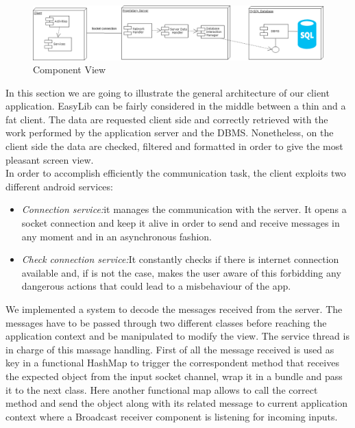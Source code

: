 \vspace*{0.5cm}
\begin{figure}[H]
	\centering
	\includegraphics[scale=0.65]{Images/Diagrams/Component_diagram}
	\caption{Component View}
\end{figure}
\vspace*{0cm}
In this section we are going to illustrate the general architecture of our client application. EasyLib can be fairly considered in the middle between a thin and a fat client. The data are requested client side and correctly retrieved with the work performed by the application server and the DBMS. Nonetheless, on the client side the data are checked, filtered and formatted in order to give the most pleasant screen view.
\\ 
In order to accomplish efficiently the communication task, the client exploits two different android services: 

\begin{itemize}
\item \emph{Connection service:}it manages the communication with the server. It opens a socket connection and keep it alive in order to send and receive messages in any moment and in an asynchronous fashion.
\item \emph{Check connection service:}It constantly checks if there is internet connection available and, if is not the case, makes the user aware of this forbidding any dangerous actions that could lead to a misbehaviour of the app.
\end{itemize}

We implemented a system to decode the messages received from the server. The messages have to be passed through two different classes before reaching the application context and be manipulated to modify the view. The service thread is in charge of this massage handling. First of all the message received is used as key in a functional HashMap to trigger the correspondent method that receives the expected object from the input socket channel, wrap it in a bundle and pass it to the next class. Here another functional map allows to call the correct method and send the object along with its related message to current application context where a Broadcast receiver component is listening for incoming inputs.

